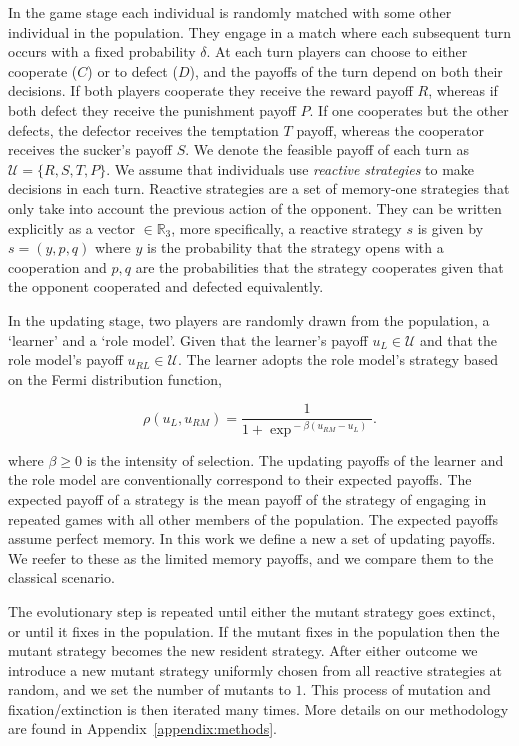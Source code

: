 \documentclass[11pt]{article}
\newcommand{\R}{\mathbb{R}}
\theoremstyle{plainCl1}
\theoremstyle{plainCl2}
\begin{document}
In the game stage each individual is randomly matched with some other individual
in the population. They engage in a match where each subsequent turn
occurs with a fixed probability $\delta$. At each turn players can choose to
either cooperate (\(C\)) or to defect (\(D\)), and the payoffs of the turn
depend on both their decisions. If both players cooperate they receive the
reward payoff \(R\), whereas if both defect they receive the punishment payoff
\(P\). If one cooperates but the other defects, the defector receives the
temptation \(T\) payoff, whereas the cooperator receives the sucker's
payoff \(S\). We denote the feasible payoff of each turn as \(\mathcal{U} =
\{R, S, T, P\}\).
We assume that individuals use \textit{reactive strategies} to make
decisions in each turn. Reactive strategies are a set of memory-one strategies
that only take into account the previous action of the opponent. They can be
written explicitly as a vector \(\in \R_{3}\), more specifically, a reactive
strategy \(s\) is given by \(s=(y, p, q)\) where \(y\) is the probability that
the strategy opens with a cooperation and \(p, q\) are the probabilities that
the strategy cooperates given that the opponent cooperated and defected
equivalently.

In the updating stage, two players are randomly drawn from the population, a
`learner' and a `role model'. Given that the learner's payoff $u_L\!\in\!
\mathcal{U}$ and that the role model's payoff $u_{RL}\!\in\! \mathcal{U}$.
The learner adopts the role model's strategy based on the Fermi
distribution function,

\begin{equation} \label{Eq:rho}
  \rho(u_{L}, u_{RM}) = \frac{1}{1\!+\! \exp^{\!-\!\beta (u_{RM}\!-\!u_{L})}}.
\end{equation}

where $\beta\!\ge\!0$ is the intensity of selection. The updating payoffs of the
learner and the role model are conventionally correspond to their expected
payoffs. The expected payoff of a strategy is the mean payoff of the strategy of
engaging in repeated games with all other members of the population. The expected payoffs
assume perfect memory. In this work we define a new a set of updating
payoffs. We reefer to these as the limited memory payoffs, and we compare them
to the classical scenario.

The evolutionary step is repeated until either the mutant strategy goes
extinct, or until it fixes in the population. If the mutant fixes in the
population then the mutant strategy becomes the new resident strategy. After
either outcome we introduce a new mutant strategy uniformly chosen from all
reactive strategies at random, and we set the number of mutants to $1$. This
process of mutation and fixation/extinction is then iterated many times.
More details on our methodology are found in Appendix~\ref{appendix:methods}.
\end{document}
